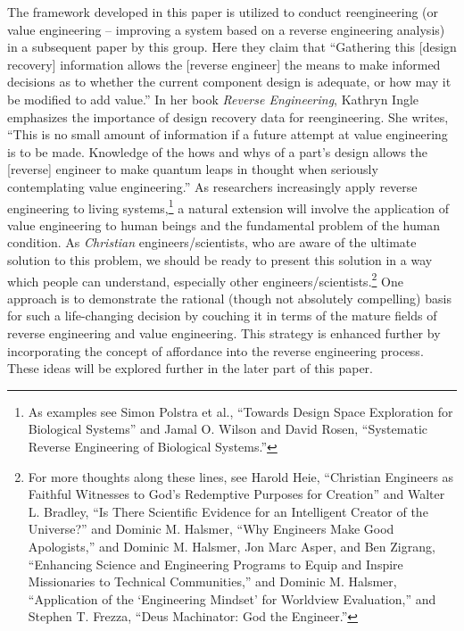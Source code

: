 The framework developed in this paper is utilized to conduct
reengineering (or value engineering – improving a system based on a
reverse engineering analysis) in a subsequent paper by this group. Here
they claim that “Gathering this [design recovery] information allows
the [reverse engineer] the means to make informed decisions as to
whether the current component design is adequate, or how may it be
modified to add value.”\citep[][pg. 166]{urbanicelmaraphy2009b} In her book \textit{Reverse
Engineering}, Kathryn Ingle emphasizes the importance of design
recovery data for reengineering. She writes, “This is no small amount
of information if a future attempt at value engineering is to be made.
Knowledge of the hows and whys of a part’s design allows the [reverse]
engineer to make quantum leaps in thought when seriously contemplating
value engineering.”\citep[][pgs. 65--66]{ingle1994} As researchers increasingly
apply reverse engineering to living systems,\footnote{
As examples see Simon Polstra et al., “Towards
Design Space Exploration for Biological Systems”\citep{polstraetal2008}
and Jamal O. Wilson and David Rosen,
“Systematic Reverse Engineering of Biological Systems.”\citep{wilsonrosen2007}
} a
natural extension will involve the application of value engineering to
human beings and the fundamental problem of the human condition. As
\textit{Christian} engineers/scientists, who are aware of the ultimate
solution to this problem, we should be ready to present this solution
in a way which people can understand, especially other
engineers/scientists.\footnote{
For more thoughts along these lines, see Harold
Heie, “Christian Engineers as Faithful Witnesses to God’s Redemptive
Purposes for Creation”\citep{heie1999}
and Walter L. Bradley,
“Is There Scientific Evidence for an Intelligent Creator of the
Universe?”\citep{bradley2003}
and Dominic M. Halsmer, “Why Engineers Make Good Apologists,”\citep{halsmer2007}
 and Dominic M. Halsmer, Jon Marc Asper, and Ben Zigrang,
“Enhancing Science and Engineering Programs to Equip and Inspire
Missionaries to Technical Communities,”\citep{halsmeretal2011}
and Dominic M. Halsmer,
“Application of the ‘Engineering Mindset’ for Worldview Evaluation,”\citep{halsmer2009}
and Stephen T. Frezza, “Deus Machinator: God the Engineer.”\citep{frezza2009}
} One approach is to
demonstrate the rational (though not absolutely compelling) basis for
such a life-changing decision by couching it in terms of the mature
fields of reverse engineering and value engineering. This strategy is
enhanced further by incorporating the concept of affordance into the
reverse engineering process. These ideas will be explored further in
the later part of this paper.

